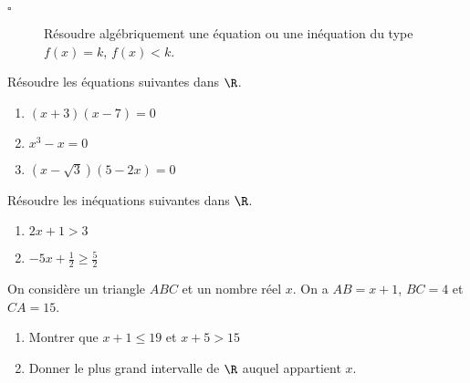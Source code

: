 \documentclass[10pt]{article}
\begin{document}
\newpage

\begin{titre}

\end{titre}

\begin{CpsCol}
\begin{description}
\item[$\square$] Résoudre algébriquement une équation ou une inéquation du type $f(x) = k$, $f(x) < k$.
\end{description}
\end{CpsCol}


 
\begin{minipage}{0.55\linewidth}

Résoudre les équations suivantes dans $\R$.

\begin{enumerate}
\item $(x+3)(x-7)=0$
\item $x^3-x=0$
\item $\left( x-\sqrt{3} \right)(5-2x)=0$
\end{enumerate}

 \end{minipage}
\begin{minipage}{0.55\linewidth}

Résoudre les inéquations suivantes dans $\R$.

\begin{enumerate}
\item $2x+1>3$
\item $-5x + \frac{1}{2} \geq \frac{5}{2}$
\end{enumerate}
 \end{minipage}


On considère un triangle $ABC$ et un nombre réel $x$. On a $AB=x+1$, $BC=4$ et $CA=15$.

\begin{enumerate}
\item Montrer que $x+1 \leq 19$ et $ x+5 > 15$
\item Donner le plus grand intervalle de $\R$ auquel appartient $x$.
\end{enumerate}




\end{document}
